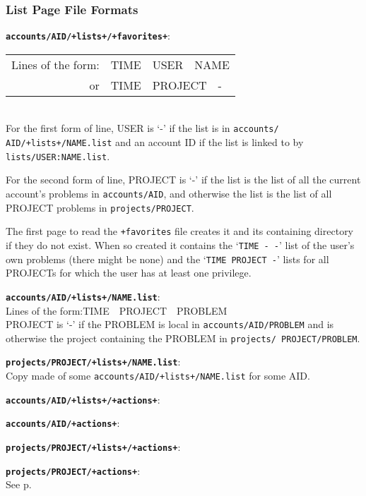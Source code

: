 \documentclass[12pt]{article}
\newenvironment{indpar}[1][0.4in]%
	{\begin{list}{}%
		     {\setlength{\itemsep}{0in}%
		      \setlength{\topsep}{0in}%
		      \setlength{\parsep}{1ex}%
		      \setlength{\labelwidth}{#1}%
		      \setlength{\leftmargin}{#1}%
		      \addtolength{\leftmargin}{\labelsep}}%
	 \item}%
	{\end{list}}
\newenvironment{itemlist}[1][0.2in]%
	{\begin{list}{}{\setlength{\labelwidth}{#1}%
		        \setlength{\leftmargin}{\labelwidth}%
		        \addtolength{\leftmargin}{+0.2in}%
		        \addtolength{\linewidth}{-\labelwidth}%
		        \addtolength{\linewidth}{-0.2in}%
		        \renewcommand{\makelabel}[1]{##1\hfill}}
	 \raggedright}%
	{\end{list}}
\newcommand{\TT}[1]{{\tt \bfseries #1}}
\newcommand{\pagref}[1]{p\pageref{#1}}
\begin{document}
\subsubsection{List Page File Formats}
\label{LIST-PAGE-FILE-FORMATS}

\begin{indpar}
\begin{itemlist}
\item[\TT{accounts/AID/+lists+/+favorites+}:] ~
\label{FAVORITES} \\
\begin{tabular}{@{}r@{~~~~~}l}
Lines of the form: & TIME~~USER~~NAME \\
or                 & TIME~~PROJECT~~- \\
\end{tabular}
\\[1ex]
For the first form of line, USER is `-' if the list is in
{\tt accounts/ AID/+lists+/NAME.list} and an account ID
if the list is linked to by
{\tt lists/USER:NAME.list}.

For the second form of line, PROJECT is `-' if the list
is the list of all the current account's problems
in {\tt accounts/AID}, and otherwise the list is the list
of all PROJECT problems in {\tt projects/PROJECT}.

The first page to read the {\tt +favorites} file creates it
and its containing directory if they do not exist.
When so created it contains the
`{\tt TIME - -}' list of the user's own problems (there might
be none) and the `{\tt TIME PROJECT -}' lists for all PROJECTs
for which the user has at least one privilege.

\item[\TT{accounts/AID/+lists+/NAME.list}:] ~
\label{LIST/NAME.LIST} \\
Lines of the form:\hspace{0.5in}TIME~~PROJECT~~PROBLEM
\\[1ex]
PROJECT is `-' if the PROBLEM is local in {\tt accounts/AID/PROBLEM}
and is otherwise the project containing the PROBLEM
in {\tt projects/ PROJECT/PROBLEM}.

\item[\TT{projects/PROJECT/+lists+/NAME.list}:] ~
    \label{LIST/PUBLISHED}\\
Copy made of some {\tt accounts/AID/+lists+/NAME.list} for some AID.

\item[\TT{accounts/AID/+lists+/+actions+}:]
\item[\TT{accounts/AID/+actions+}:]\vspace*{-1ex} ~ \\
\item[\TT{projects/PROJECT/+lists+/+actions+}:]\vspace*{-1ex} ~ \\
\item[\TT{projects/PROJECT/+actions+}:]\vspace*{-1ex} ~ \\
    See \pagref{ACCOUNT-ACTIONS}.

\end{itemlist}
\end{indpar}
\end{document}
